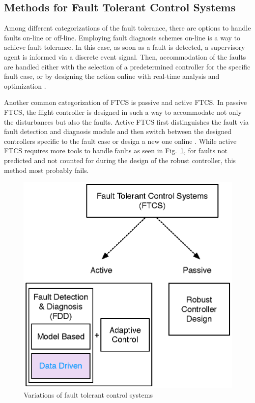 \subsection{Methods for Fault Tolerant Control Systems}\label{ch1:methodsFTCS}

Among different categorizations of the fault tolerance, there are options to handle 
faults on-line or off-line. Employing fault diagnosis schemes on-line is a way to 
achieve fault tolerance. In this case, as soon as a fault is detected, a supervisory 
agent is informed via a discrete event signal. Then, accommodation of the faults 
are handled either with the selection of a predetermined controller for the specific 
fault case, or by designing the action online with real-time analysis and optimization \cite{blanke2000fault}.

Another common categorization of FTCS is passive and active FTCS. In passive FTCS, 
the flight controller is designed in such a way to accommodate not only the 
disturbances but also the faults. Active FTCS first distinguishes the fault via fault detection 
and diagnosis module and then switch between the designed controllers specific to the 
fault case or design a new one online \cite{angelov2012sense}. While active FTCS 
requires more tools to handle faults as seen in Fig.~\ref{fig:FTCS}, for faults 
not predicted and not counted for during the design of the robust controller, this method 
most probably fails. 

\begin{figure}
\begin{center}
\includegraphics[width=11.3cm]{figures/FTCS}
\caption{Variations of fault tolerant control systems } 
\label{fig:FTCS}
\end{center}
\end{figure}


